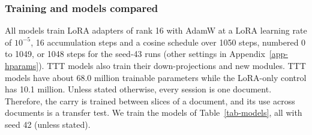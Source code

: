 \documentclass[10pt]{article} %
\begin{document}
\subsubsection{Training and models compared}

All models train LoRA adapters \citep{hu2022lora} of rank 16 with AdamW \citep{loshchilov2019decoupled} at a LoRA learning rate of $10^{-5}$, 16 accumulation steps and a cosine schedule \citep{loshchilov2017sgdr} over 1050 steps, numbered 0 to 1049, or 1048 steps for the seed-43 runs (other settings in Appendix~\ref{app-hparams}). TTT models also train their down-projections and new modules. TTT models have about 68.0 million trainable parameters while the LoRA-only control has 10.1 million. Unless stated otherwise, every session is one document. Therefore, the carry is trained between slices of a document, and its use across documents is a transfer test. We train the models of Table~\ref{tab-models}, all with seed 42 (unless stated).
\end{document}

